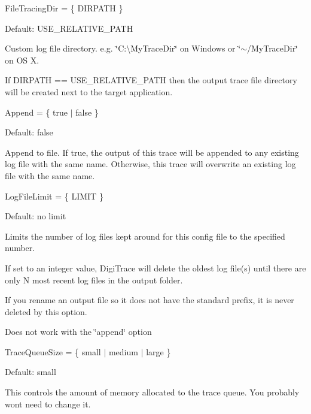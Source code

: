 \begin{DoxyItemize}
\item {\ttfamily File\+Tracing\+Dir = \{ D\+I\+R\+P\+A\+T\+H \} } 
\begin{DoxyItemize}
\item Default\+: {\ttfamily U\+S\+E\+\_\+\+R\+E\+L\+A\+T\+I\+V\+E\+\_\+\+P\+A\+T\+H}  
\item Custom log file directory. e.\+g. \char`\"{}\+C\+:\textbackslash{}\+My\+Trace\+Dir\char`\"{} on Windows or \char`\"{}$\sim$/\+My\+Trace\+Dir\char`\"{} on O\+S X.  
\item If D\+I\+R\+P\+A\+T\+H == U\+S\+E\+\_\+\+R\+E\+L\+A\+T\+I\+V\+E\+\_\+\+P\+A\+T\+H then the output trace file directory will be created next to the target application.  
\end{DoxyItemize}
\item {\ttfamily Append = \{ true $\vert$ false \} } 
\begin{DoxyItemize}
\item Default\+: {\ttfamily false}  
\item Append to file. If {\ttfamily true}, the output of this trace will be appended to any existing log file with the same name. Otherwise, this trace will overwrite an existing log file with the same name.  
\end{DoxyItemize}
\item {\ttfamily Log\+File\+Limit = \{ L\+I\+M\+I\+T \} } 
\begin{DoxyItemize}
\item Default\+: no limit  
\item Limits the number of log files kept around for this config file to the specified number.  
\item If set to an integer value, Digi\+Trace will delete the oldest log file(s) until there are only N most recent log files in the output folder.  
\item If you rename an output file so it does not have the standard prefix, it is never deleted by this option.  
\item Does not work with the \char`\"{}append\char`\"{} option  
\end{DoxyItemize}
\item {\ttfamily Trace\+Queue\+Size = \{ small $\vert$ medium $\vert$ large \} } 
\begin{DoxyItemize}
\item Default\+: {\ttfamily small}  
\item This controls the amount of memory allocated to the trace queue. You probably won\textquotesingle{}t need to change it.  

\end{DoxyItemize}
\end{DoxyItemize}
